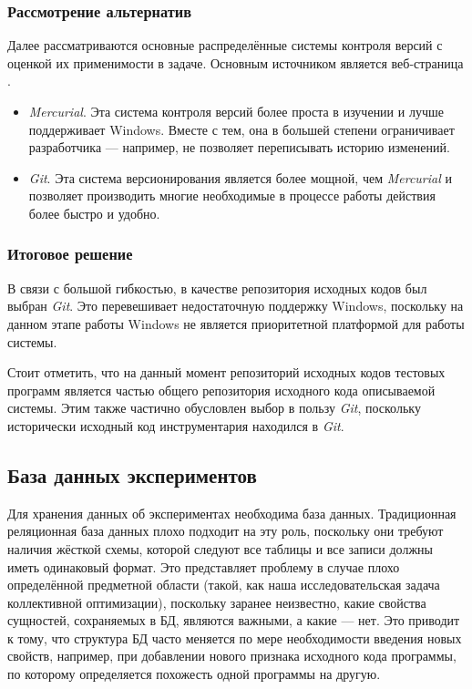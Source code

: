 \subsubsection{Рассмотрение альтернатив}
Далее рассматриваются основные распределённые системы контроля версий с оценкой их применимости в задаче. Основным источником является веб-страница \cite{git-vs-hg}.
\begin{itemize}
    \item \textit{Mercurial}. Эта система контроля версий более проста в изучении и лучше поддерживает Windows. Вместе с тем, она в большей степени ограничивает разработчика --- например, не позволяет переписывать историю изменений.
    \item \textit{Git}. Эта система версионирования является более мощной, чем \textit{Mercurial} и позволяет производить многие необходимые в процессе работы действия более быстро и удобно.
\end{itemize}

\subsubsection{Итоговое решение}
В связи с большой гибкостью, в качестве репозитория исходных кодов был выбран \textit{Git}. Это перевешивает недостаточную поддержку Windows, поскольку на данном этапе работы Windows не является приоритетной платформой для работы системы.

Стоит отметить, что на данный момент репозиторий исходных кодов тестовых программ является частью общего репозитория исходного кода описываемой системы. Этим также частично обусловлен выбор в пользу \textit{Git}, поскольку исторически исходный код инструментария находился в \textit{Git}.


\subsection{База данных экспериментов}
Для хранения данных об экспериментах необходима база данных. Традиционная реляционная база данных плохо подходит на эту роль, поскольку они требуют наличия жёсткой схемы, которой следуют все таблицы и все записи должны иметь одинаковый формат. Это представляет проблему в случае плохо определённой предметной области (такой, как наша исследовательская задача коллективной оптимизации), поскольку заранее неизвестно, какие свойства сущностей, сохраняемых в БД, являются важными, а какие --- нет. Это приводит к тому, что структура БД часто меняется по мере необходимости введения новых свойств, например, при добавлении нового признака исходного кода программы, по которому определяется похожесть одной программы на другую.

